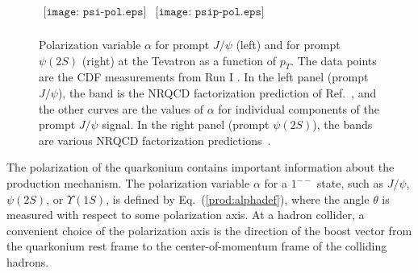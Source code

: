 \begin{figure}[htb]
\begin{center}
$ \begin{array}{cc}
\texttt{[image: psi-pol.eps]}
&
\texttt{[image: psip-pol.eps]} \\
\end{array} $
\caption{
Polarization variable $\alpha$ for prompt $J/\psi$ (left) and for
prompt $\psi(2S)$ (right) at the Tevatron as a function of $p_T$.  The
data points are the CDF measurements from Run I
\cite{Affolder:2000nn}. In the left panel (prompt $J/\psi$), the band
is the NRQCD factorization prediction of Ref.~\cite{Braaten:1999qk},
and the other curves are the values of $\alpha$ for individual
components of the prompt $J/\psi$ signal. In the right panel (prompt
$\psi(2S)$), the bands are various NRQCD factorization
predictions~\cite{Beneke:1996yw,Leibovich:1996pa,Braaten:1999qk}.}
\label{fig-pol}
\end{center}
\end{figure}

The polarization of the quarkonium contains important information 
about the production mechanism. The polarization variable $\alpha$ 
for a $1^{--}$ state, such as $J/\psi$, $\psi(2S)$, or $\Upsilon(1S)$, 
is defined by Eq.~(\ref{prod:alphadef}), where the angle $\theta$
is measured with respect to some polarization axis. 
At a hadron collider, a convenient choice of the polarization axis
is the direction of the boost vector from the quarkonium rest frame 
to the center-of-momentum frame of the colliding hadrons.  

